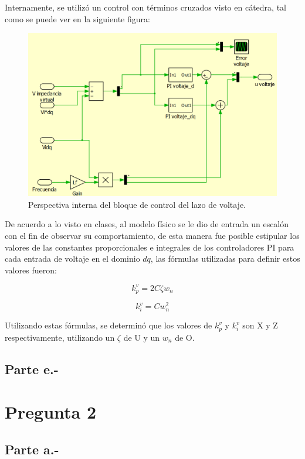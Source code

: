 Internamente, se utilizó un control con términos cruzados visto en cátedra, tal como se puede ver en la siguiente figura:

\begin{figure}
   \centering
   \includegraphics[width=0.5\linewidth]{Tarea 1/report/imagenes/p1d/vcl bloque interno.png}
   \caption{Perspectiva interna del bloque de control del lazo de voltaje.}
   \label{vcl interno}
\end{figure}

De acuerdo a lo visto en clases, al modelo físico se le dio de entrada un escalón con el fin de observar su comportamiento, de esta manera fue posible estipular los valores de las constantes proporcionales e integrales de los controladores PI para cada entrada de voltaje en el dominio $dq$, las fórmulas utilizadas para definir estos valores fueron:

\begin{equation}
    k_p^v = 2C\zeta w_{n}
\end{equation}

\begin{equation}
    k_i^v = Cw_{n}^2
\end{equation}

Utilizando estas fórmulas, se determinó que los valores de $k_p^v$ y $k_i^v$ son X y Z respectivamente, utilizando un $\zeta$ de U y un $w_{n}$ de O.

\subsection{Parte e.-}



\section{Pregunta 2}

\subsection{Parte a.-}

